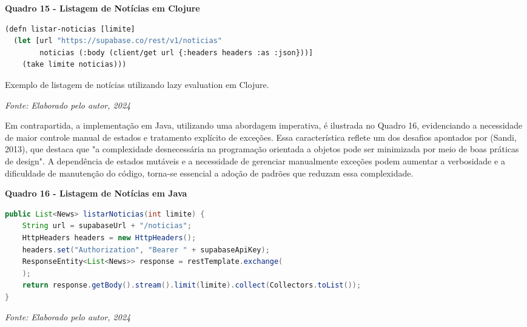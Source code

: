 \begin{center}
    \textbf{Quadro 15 - Listagem de Notícias em Clojure}
\end{center}

\begin{tcolorbox}[colback=gray!5!white, colframe=gray!75!black, title=]
\begin{lstlisting}[language=Lisp]
(defn listar-noticias [limite]
  (let [url "https://supabase.co/rest/v1/noticias"
        noticias (:body (client/get url {:headers headers :as :json}))]
    (take limite noticias)))
\end{lstlisting}
\caption{Exemplo de listagem de notícias utilizando lazy evaluation em Clojure.}
\end{tcolorbox}

\begin{center}
    \textit{Fonte: Elaborado pelo autor, 2024} 
\end{center}

Em contrapartida, a implementação em Java, utilizando uma abordagem imperativa, é ilustrada no Quadro 16, evidenciando a necessidade de maior controle manual de estados e tratamento explícito de exceções. Essa característica reflete um dos desafios apontados por (Sandi, 2013), que destaca que "a complexidade desnecessária na programação orientada a objetos pode ser minimizada por meio de boas práticas de design". A dependência de estados mutáveis e a necessidade de gerenciar manualmente exceções podem aumentar a verbosidade e a dificuldade de manutenção do código, torna-se essencial a adoção de padrões que reduzam essa complexidade.

\begin{center}
    \textbf{Quadro 16 - Listagem de Notícias em Java}
\end{center}

\begin{tcolorbox}[colback=gray!5!white, colframe=gray!75!black, title=]
\begin{lstlisting}[language=Java]
public List<News> listarNoticias(int limite) {
    String url = supabaseUrl + "/noticias";
    HttpHeaders headers = new HttpHeaders();
    headers.set("Authorization", "Bearer " + supabaseApiKey);
    ResponseEntity<List<News>> response = restTemplate.exchange(
    );
    return response.getBody().stream().limit(limite).collect(Collectors.toList());
}
\end{lstlisting}
\end{tcolorbox}
\begin{center}
    \textit{Fonte: Elaborado pelo autor, 2024} 
\end{center}

